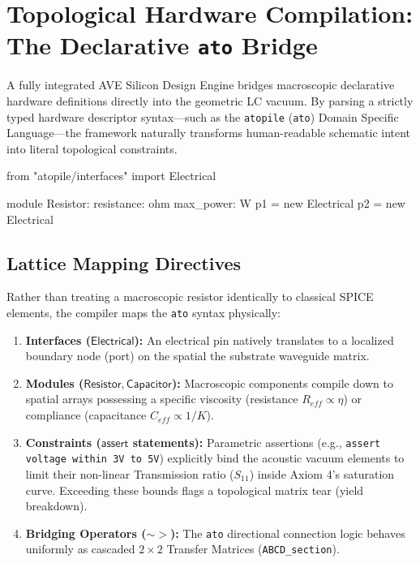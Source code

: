 \section{Topological Hardware Compilation: The Declarative \texttt{ato} Bridge}
\label{sec:ato_compilation}

A fully integrated AVE Silicon Design Engine bridges macroscopic declarative hardware definitions directly into the geometric LC vacuum. By parsing a strictly typed hardware descriptor syntax---such as the \texttt{atopile} (\texttt{ato}) Domain Specific Language---the framework naturally transforms human-readable schematic intent into literal topological constraints.

\begin{codebox}
from "atopile/interfaces" import Electrical

module Resistor:
    resistance: ohm
    max\_power: W
    p1 = new Electrical
    p2 = new Electrical
\end{codebox}

\subsection{Lattice Mapping Directives}
Rather than treating a macroscopic resistor identically to classical SPICE elements, the compiler maps the \texttt{ato} syntax physically:
\begin{enumerate}
    \item \textbf{Interfaces ($\mathsf{Electrical}$):} An electrical pin natively translates to a localized boundary node (port) on the spatial the substrate waveguide matrix. 
    \item \textbf{Modules ($\mathsf{Resistor},\mathsf{Capacitor}$):} Macroscopic components compile down to spatial arrays possessing a specific viscosity (resistance $R_{eff} \propto \eta$) or compliance (capacitance $C_{eff} \propto 1/K$).
    \item \textbf{Constraints ($\mathsf{assert}$ statements):} Parametric assertions (e.g., \texttt{assert voltage within 3V to 5V}) explicitly bind the acoustic vacuum elements to limit their non-linear Transmission ratio ($S_{11}$) inside Axiom 4's saturation curve. Exceeding these bounds flags a topological matrix tear (yield breakdown).
    \item \textbf{Bridging Operators ($\sim>$):} The \texttt{ato} directional connection logic behaves uniformly as cascaded $2\times 2$ Transfer Matrices (\texttt{ABCD\_section}).
\end{enumerate}

